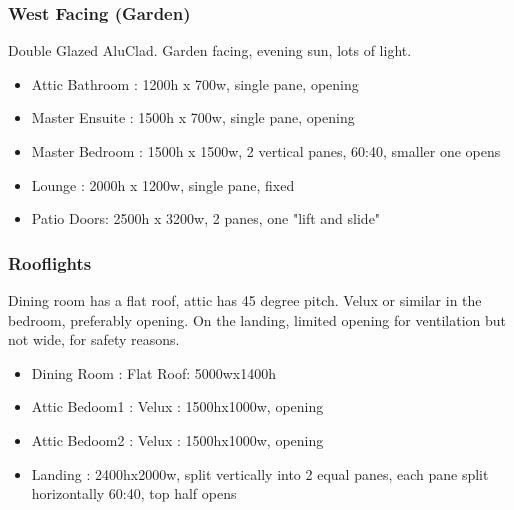 \subsubsection{West Facing (Garden)}
Double Glazed AluClad. Garden facing, evening sun, lots of light.
\begin{itemize}
\item Attic Bathroom : 1200h x 700w, single pane, opening
\item Master Ensuite : 1500h x 700w, single pane, opening
\item Master Bedroom : 1500h x 1500w, 2 vertical panes, 60:40, smaller one opens
\item Lounge : 2000h x 1200w, single pane, fixed
\item Patio Doors: 2500h x 3200w, 2 panes, one "lift and slide"
\end{itemize}

\subsubsection{Rooflights}
Dining room has a flat roof, attic has 45 degree pitch. Velux or similar in the bedroom, preferably opening.
On the landing, limited opening for ventilation but not wide, for safety reasons.
\begin{itemize}
\item Dining Room : Flat Roof: 5000wx1400h
\item Attic Bedoom1 : Velux : 1500hx1000w, opening
\item Attic Bedoom2 : Velux : 1500hx1000w, opening
\item Landing : 2400hx2000w, split vertically into 2 equal panes, each pane split horizontally 60:40, top half opens
\end{itemize}    
